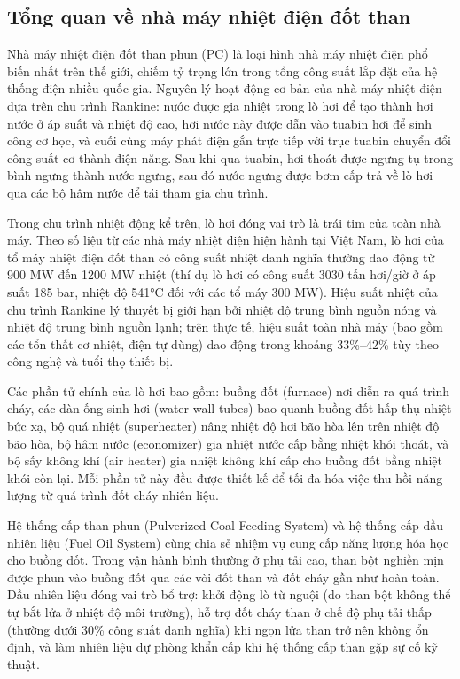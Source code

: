 \documentclass[../main.tex]{subfiles}
\begin{document}
\subsection{Tổng quan về nhà máy nhiệt điện đốt than}

Nhà máy nhiệt điện đốt than phun (PC) là loại hình nhà máy nhiệt điện phổ biến nhất trên thế giới, chiếm tỷ trọng lớn trong tổng công suất lắp đặt của hệ thống điện nhiều quốc gia. Nguyên lý hoạt động cơ bản của nhà máy nhiệt điện dựa trên chu trình Rankine: nước được gia nhiệt trong lò hơi để tạo thành hơi nước ở áp suất và nhiệt độ cao, hơi nước này được dẫn vào tuabin hơi để sinh công cơ học, và cuối cùng máy phát điện gắn trực tiếp với trục tuabin chuyển đổi công suất cơ thành điện năng. Sau khi qua tuabin, hơi thoát được ngưng tụ trong bình ngưng thành nước ngưng, sau đó nước ngưng được bơm cấp trả về lò hơi qua các bộ hâm nước để tái tham gia chu trình.

Trong chu trình nhiệt động kể trên, lò hơi đóng vai trò là trái tim của toàn nhà máy. Theo số liệu từ các nhà máy nhiệt điện hiện hành tại Việt Nam, lò hơi của tổ máy nhiệt điện đốt than có công suất nhiệt danh nghĩa thường dao động từ 900 MW đến 1200 MW nhiệt (thí dụ lò hơi có công suất 3030 tấn hơi/giờ ở áp suất 185 bar, nhiệt độ 541°C đối với các tổ máy 300 MW). Hiệu suất nhiệt của chu trình Rankine lý thuyết bị giới hạn bởi nhiệt độ trung bình nguồn nóng và nhiệt độ trung bình nguồn lạnh; trên thực tế, hiệu suất toàn nhà máy (bao gồm các tổn thất cơ nhiệt, điện tự dùng) dao động trong khoảng 33\%--42\% tùy theo công nghệ và tuổi thọ thiết bị.

Các phần tử chính của lò hơi bao gồm: buồng đốt (furnace) nơi diễn ra quá trình cháy, các dàn ống sinh hơi (water-wall tubes) bao quanh buồng đốt hấp thụ nhiệt bức xạ, bộ quá nhiệt (superheater) nâng nhiệt độ hơi bão hòa lên trên nhiệt độ bão hòa, bộ hâm nước (economizer) gia nhiệt nước cấp bằng nhiệt khói thoát, và bộ sấy không khí (air heater) gia nhiệt không khí cấp cho buồng đốt bằng nhiệt khói còn lại. Mỗi phần tử này đều được thiết kế để tối đa hóa việc thu hồi năng lượng từ quá trình đốt cháy nhiên liệu.

Hệ thống cấp than phun (Pulverized Coal Feeding System) và hệ thống cấp dầu nhiên liệu (Fuel Oil System) cùng chia sẻ nhiệm vụ cung cấp năng lượng hóa học cho buồng đốt. Trong vận hành bình thường ở phụ tải cao, than bột nghiền mịn được phun vào buồng đốt qua các vòi đốt than và đốt cháy gần như hoàn toàn. Dầu nhiên liệu đóng vai trò bổ trợ: khởi động lò từ nguội (do than bột không thể tự bắt lửa ở nhiệt độ môi trường), hỗ trợ đốt cháy than ở chế độ phụ tải thấp (thường dưới 30\% công suất danh nghĩa) khi ngọn lửa than trở nên không ổn định, và làm nhiên liệu dự phòng khẩn cấp khi hệ thống cấp than gặp sự cố kỹ thuật.
\end{document}
